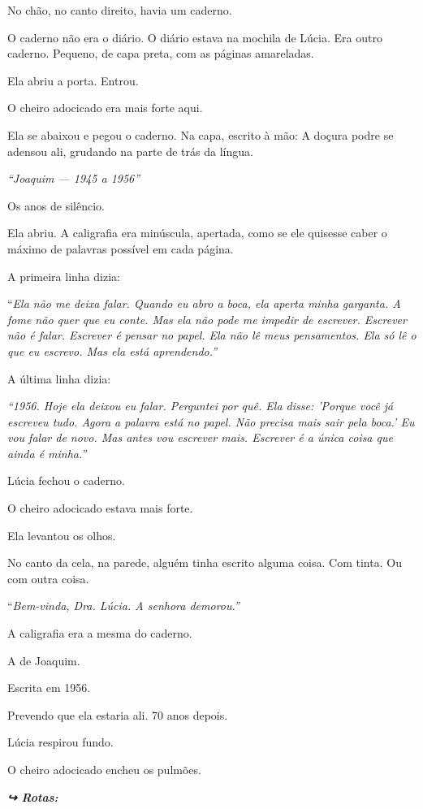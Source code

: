 \noindent No chão, no canto direito, havia um caderno.

\noindent O caderno não era o diário. O diário estava na mochila de Lúcia. Era outro caderno. Pequeno, de capa preta, com as páginas amareladas.

\noindent Ela abriu a porta. Entrou.

\noindent O cheiro adocicado era mais forte aqui.

\noindent Ela se abaixou e pegou o caderno. Na capa, escrito à mão:
\noindent A doçura podre se adensou ali, grudando na parte de trás da língua.

\noindent \textit{\textquotedblleft{}Joaquim --- 1945 a 1956\textquotedblright{}}

\noindent Os anos de silêncio.

\noindent Ela abriu. A caligrafia era minúscula, apertada, como se ele quisesse caber o máximo de palavras possível em cada página.

\noindent A primeira linha dizia:

\noindent \textquotedblleft{\textit{Ela não me deixa falar. Quando eu abro a boca, ela aperta minha garganta. A fome não quer que eu conte. Mas ela não pode me impedir de escrever. Escrever não é falar. Escrever é pensar no papel. Ela não lê meus pensamentos. Ela só lê o que eu escrevo. Mas ela está aprendendo.\textquotedblright{}}}

\noindent A última linha dizia:

\noindent \textit{\textquotedblleft{}1956. Hoje ela deixou eu falar. Perguntei por quê. Ela disse: 'Porque você já escreveu tudo. Agora a palavra está no papel. Não precisa mais sair pela boca.' Eu vou falar de novo. Mas antes vou escrever mais. Escrever é a única coisa que ainda é minha.\textquotedblright{}}

\noindent Lúcia fechou o caderno.

\noindent O cheiro adocicado estava mais forte.

\noindent Ela levantou os olhos.

\noindent No canto da cela, na parede, alguém tinha escrito alguma coisa. Com tinta. Ou com outra coisa.

\noindent \textquotedblleft{\textit{Bem-vinda, Dra. Lúcia. A senhora demorou.\textquotedblright{}}}

\noindent A caligrafia era a mesma do caderno.

\noindent A de Joaquim.

\noindent Escrita em 1956.

\noindent Prevendo que ela estaria ali. 70 anos depois.

\noindent Lúcia respirou fundo.

\noindent O cheiro adocicado encheu os pulmões.

\vspace{0.5em}
\noindent\textit{\textbf{↪ Rotas:}  \rotasep {}}